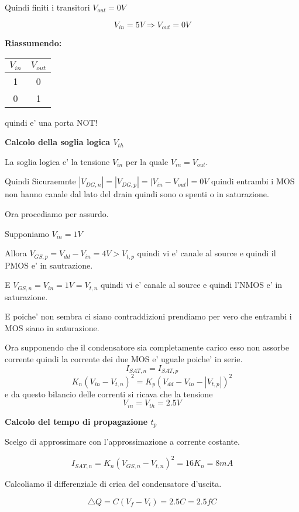 \documentclass[\main/main.tex]{subfiles}
\begin{document}
Quindi finiti i transitori $V_{out} = 0V$

\[V_{in} = 5V \Rightarrow V_{out} = 0V\]

\textbf{Riassumendo:}
\begin{center}
	\begin{tabular}{ c | c }
		$V_{in}$ & $V_{out}$ \\
		\hline
		1        & 0         \\
		0        & 1         \\
	\end{tabular}
\end{center}
quindi e' una porta NOT!


\clearpage
\textbf{Calcolo della soglia logica $V_{th}$}

La soglia logica e' la tensione $V_{in}$ per la quale $V_{in} = V_{out}$.

Quindi Sicuraemnte $|V_{DG,n}| = |V_{DG,p}| = |V_{in} - V_{out}| = 0V$ quindi entrambi i MOS non hanno canale dal lato del drain quindi sono o spenti o in saturazione.

Ora procediamo per assurdo.

Supponiamo $V_{in} = 1V$

Allora $V_{GS,p} = V_{dd} - V_{in} = 4V > V_{t,p}$ quindi vi e' canale al source e quindi il PMOS e' in sautrazione.

E $V_{GS,n} = V_{in} = 1V = V_{t,n}$ quindi vi e' canale al source e quindi l'NMOS e' in saturazione.

E poiche' non sembra ci siano contraddizioni prendiamo per vero che entrambi i MOS siano in saturazione.

Ora supponendo che il condensatore sia completamente carico esso non assorbe corrente quindi la corrente dei due MOS e' uguale poiche' in serie.
\[I_{SAT,n} = I_{SAT,p}\]
\[K_n \left(V_{in} - V_{t,n} \right )^2 = K_p \left(V_{dd} - V_{in} - |V_{t,p}| \right )^2\]
e da questo bilancio delle correnti si ricava che la tensione
\[V_{in} = V_{th} = 2.5V\]

\textbf{Calcolo del tempo di propagazione $t_p$}

Scelgo di approssimare con l'approssimazione a corrente costante.

\[I_{SAT,n} = K_n \left( V_{GS,n} - V_{t,n} \right)^2 = 16 K_n = 8mA\]

Calcoliamo il differenziale di crica del condensatore d'uscita.

\[ \triangle Q = C \left( V_f  - V_i\right) = 2.5 C = 2.5 fC\]
\end{document}
